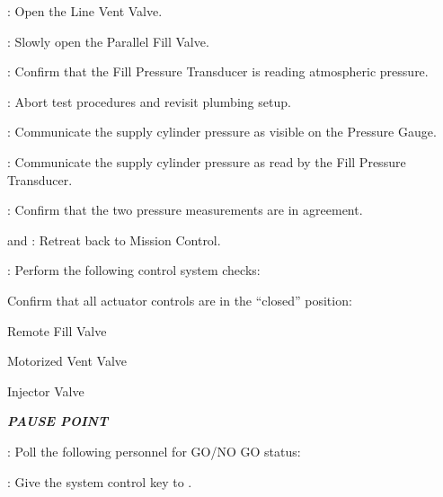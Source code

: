 \begin{checklist}
\begin{checklist}[label=$\bullet$]
\begin{checklist}
            \item \primary{}: Open the Line Vent Valve.
            \item \primary{}: Slowly open the Parallel Fill Valve.
            \item \daq{}: Confirm that the Fill Pressure Transducer is reading atmospheric pressure.
            \item \ops{}: Abort test procedures and revisit plumbing setup.
        \end{checklist}
    \end{checklist}
    \item \primary{}: Communicate the supply cylinder pressure as visible on the Pressure Gauge.
    \item \daq{}: Communicate the supply cylinder pressure as read by the Fill Pressure Transducer.
    \item \daq{}: Confirm that the two pressure measurements are in agreement.
    \item \primary{} and \secondary{}: Retreat back to Mission Control.
    \item \control{}: Perform the following control system checks:
    \begin{checklist}
        \item Confirm that all actuator controls are in the ``closed'' position:
        \begin{checklist}
            \item Remote Fill Valve
            \item Motorized Vent Valve
            \item Injector Valve
        \end{checklist}
    \end{checklist}
    \item \textbf{\textit{PAUSE POINT}}
    \item \ops{}: Poll the following personnel for GO/NO GO status:
    \begin{checklist}
        \item \heat{}
	\item \control{}
        \item \daq{}
        \item \primary{}
        \item \secondary{}
	\item \peri{}
	\item \perii{}
	\item \periii{}
    \end{checklist}
    \item \ops: Give the system control key to \control{}.

\end{checklist}
